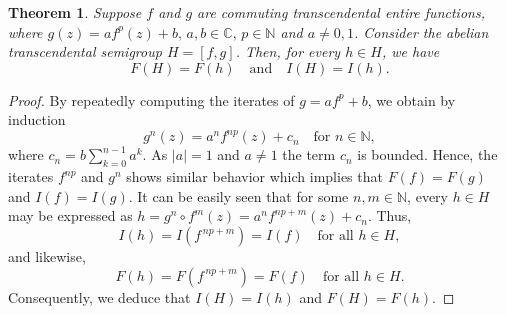 \documentclass[a4paper,12pt]{amsart}
\numberwithin{equation}{section}
\newtheorem{theorem}{Theorem}[section]
\newtheorem{remark}[theorem]{Remark}
\begin{document}
	\begin{theorem}\label {Th 1}
		Suppose $f$ and $g$ are commuting transcendental entire functions, where $g(z) = af^p(z) + b, \, a,b \in \mathbb{C}, \, p\in \mathbb{N}$ and $a \neq 0,1$.  
		Consider the abelian transcendental semigroup $H = [f,g]$. Then, for every $h \in H$, we have
		\[
		F(H) = F(h) \quad \text{and} \quad I(H) = I(h).
		\]
	\end{theorem}
	\begin{proof}
		
		
	By repeatedly computing the iterates of $g = af^p + b$, we obtain by induction
		\[g^n(z) = a^n f^{np}(z) + c_n \quad \text{for } n \in \mathbb{N}, \] where $c_n= b \sum_{k=0}^{n-1}a^k$. As $|a|=1$ and $a\neq 1$ the term $c_n$ is bounded. Hence, the iterates $f^{np}$ and $g^n$ shows similar behavior which implies that $F(f) = F(g)$ and $I(f) = I(g)$. It can be easily seen that for some $n, m \in \mathbb{N}$, every $h \in H$ may be expressed as $h = g^n \circ f^m(z) = a^n f^{np+m}(z) + c_n$. Thus, \[ I(h) = I(f^{\,np+m}) = I(f) \quad \text{for all } h \in H, \] and likewise, \[ F(h) = F(f^{\,np+m}) = F(f) \quad \text{for all } h \in H. \]
		Consequently, we deduce that $I(H) = I(h)$ and $F(H) = F(h)$.
	\end{proof}
\end{document}
